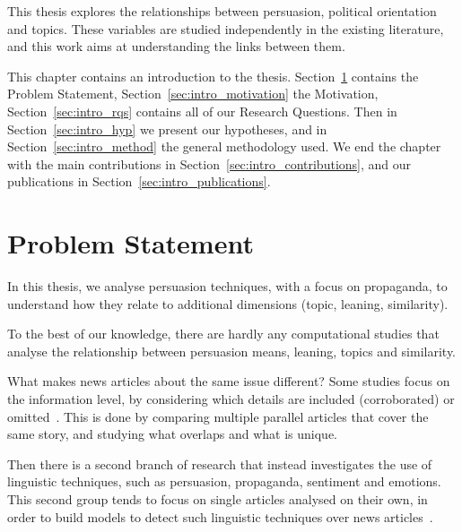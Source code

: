 This thesis explores the relationships between persuasion, political orientation and topics.
These variables are studied independently in the existing literature, and this work aims at understanding the links between them.









This chapter contains an introduction to the thesis.
Section~\ref{sec:intro_problem} contains the Problem Statement, Section~\ref{sec:intro_motivation} the Motivation, Section~\ref{sec:intro_rqs} contains all of our Research Questions. Then in Section~\ref{sec:intro_hyp} we present our hypotheses, and in Section~\ref{sec:intro_method} the general methodology used. We end the chapter with the main contributions in Section~\ref{sec:intro_contributions}, %
and our publications in Section~\ref{sec:intro_publications}.


\section{\statusgreen Problem Statement}
\label{sec:intro_problem}



In this thesis, we analyse persuasion techniques, with a focus on propaganda, to understand how they relate to additional dimensions (topic, leaning, similarity).

To the best of our knowledge, there are hardly any computational studies that analyse the relationship between persuasion means, leaning, topics and similarity.

What makes news articles about the same issue different? 
Some studies focus on the information level, by considering which details are included (corroborated) or omitted~\citep{bountouridis2018explaining}.
This is done by comparing multiple parallel articles that cover the same story, and studying what overlaps and what is unique.

Then there is a second branch of research that instead investigates the use of linguistic techniques, such as persuasion, propaganda, sentiment and emotions. This second group tends to focus on single articles analysed on their own, in order to build models to detect such linguistic techniques over news articles~\citep{da2019fine}. %

